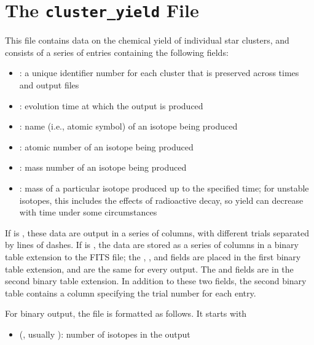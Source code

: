 \documentclass[letterpaper,10pt,english]{sphinxmanual}
\begin{document}
\section{The \texttt{cluster\_yield} File}
\label{output:ssec-cluster-yield-file}\label{output:the-cluster-yield-file}
This file contains data on the chemical yield of individual star
clusters, and consists of a series of entries containing the following
fields:
\begin{itemize}
\item {} 
: a unique identifier number for each cluster that is
preserved across times and output files

\item {} 
: evolution time at which the output is produced

\item {} 
: name (i.e., atomic symbol) of an isotope being produced

\item {} 
: atomic number of an isotope being produced

\item {} 
: mass number of an isotope being produced

\item {} 
: mass of a particular isotope produced up to the specified
time; for unstable isotopes, this includes the effects of
radioactive decay, so yield can decrease with time under some
circumstances

\end{itemize}

If  is , these data are output in a series of
columns, with different trials separated by lines of dashes. If
 is , the data are stored as a series of
columns in a binary table extension to the FITS file; the ,
, and  fields are placed in the first binary table
extension, and are the same for every output. The  and
 fields are in the second binary table extension. In
addition to these two fields, the second binary table contains a
column specifying the trial number for each entry.

For binary output, the file is formatted as follows. It starts with
\begin{itemize}
\item {} 
 (, usually ): number of isotopes in the output

\end{itemize}
\end{document}
